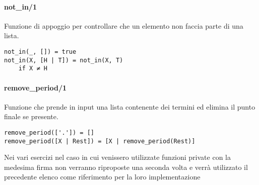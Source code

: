 \documentclass[12pt,twoside]{report}
\begin{document}
\paragraph{not\_in/1}
Funzione di appoggio per controllare che un elemento non faccia parte di una lista.
\begin{lstlisting}
not_in(_, []) = true
not_in(X, [H | T]) = not_in(X, T)
    if X ≠ H
\end{lstlisting}

\paragraph{remove\_period/1}
Funzione che prende in input una lista contenente dei termini ed elimina il punto finale se presente.
\begin{lstlisting}
remove_period(['.']) = []
remove_period([X | Rest]) = [X | remove_period(Rest)]
\end{lstlisting}
Nei vari esercizi nel caso in cui venissero utilizzate funzioni private con la medesima firma non verranno riproposte una seconda volta e verrà utilizzato il precedente elenco come riferimento per la loro implementazione
\end{document}
